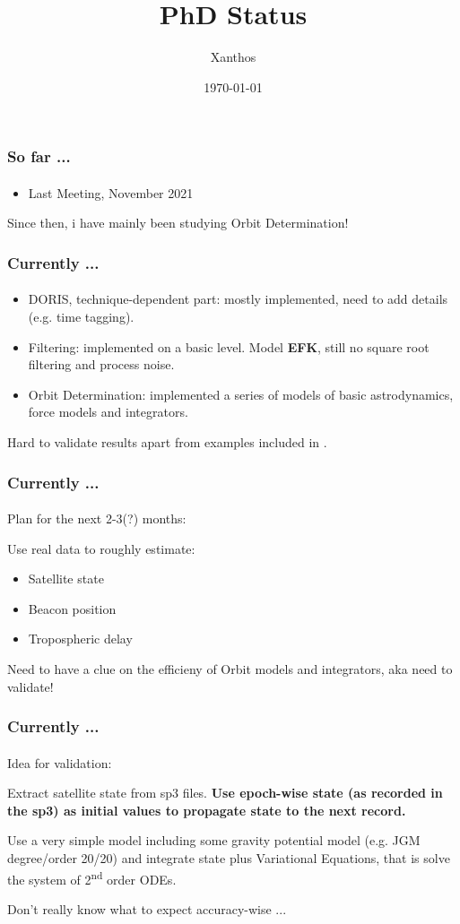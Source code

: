 \documentclass{beamer}
\title[]{PhD Status}
\author{Xanthos}
\institute{DSO \& IGN}
\date{\today}
\newcommand{\citem}{\item[\checkmark]}
\newcommand{\bitem}{\item[\textbullet]}
\begin{document}
\begin{frame}
  \titlepage
\end{frame}

\begin{frame}\frametitle{So far ...}\framesubtitle{}
    \begin{itemize}
      \citem Last Meeting, November 2021
    \end{itemize}

    Since then, i have mainly been studying Orbit Determination!

\end{frame}

\begin{frame}\frametitle{Currently ...}\framesubtitle{}
    \begin{itemize}
        \bitem DORIS, technique-dependent part: mostly implemented, need to 
        add details (e.g. time tagging).

        \bitem Filtering: implemented on a basic level. Model \textbf{EFK}, 
        still no square root filtering and process noise.

        \bitem Orbit Determination: implemented a series of models of basic 
        astrodynamics, force models and integrators.
      \end{itemize}

      \medskip

      Hard to validate results apart from examples included in 
      \cite{Montenbruck2000}.

\end{frame}

\begin{frame}\frametitle{Currently ...}\framesubtitle{}
    Plan for the next 2-3(?) months:
    \medskip
    
    Use real data to roughly estimate:
    \begin{itemize}
        \bitem Satellite state
        \bitem Beacon position
        \bitem Tropospheric delay
    \end{itemize}

    \medskip
    Need to have a clue on the efficieny of Orbit models and integrators, aka 
    need to validate!
    
\end{frame}

\begin{frame}\frametitle{Currently ...}\framesubtitle{}
    Idea for validation:
    \medskip

    Extract satellite state from sp3 files.
    \textbf{Use epoch-wise state (as recorded in the sp3) as initial values to 
    propagate state to the next record.}

    \smallskip
    Use a very simple model including some gravity potential model (e.g. JGM 
    degree/order 20/20) and integrate state plus Variational Equations, that 
    is solve the system of 2\textsuperscript{nd} order ODEs.

    \smallskip
    Don't really know what to expect accuracy-wise ...
    
\end{frame}
\end{document}

